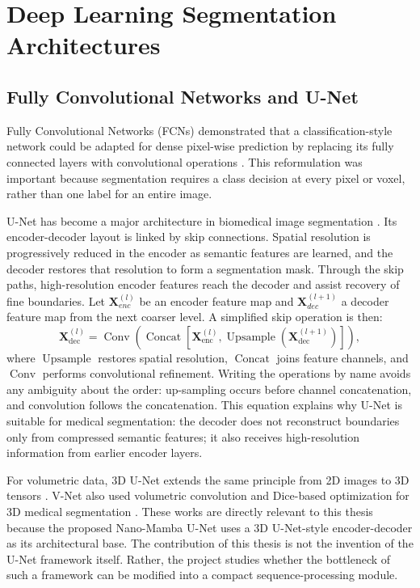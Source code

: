 \section{Deep Learning Segmentation Architectures}
\subsection{Fully Convolutional Networks and U-Net}
Fully Convolutional Networks (FCNs) demonstrated that a classification-style network could be adapted for dense pixel-wise prediction by replacing its fully connected layers with convolutional operations \citep{long2015fully}. This reformulation was important because segmentation requires a class decision at every pixel or voxel, rather than one label for an entire image.

U-Net has become a major architecture in biomedical image segmentation \citep{ronneberger2015u}. Its encoder-decoder layout is linked by skip connections. Spatial resolution is progressively reduced in the encoder as semantic features are learned, and the decoder restores that resolution to form a segmentation mask. Through the skip paths, high-resolution encoder features reach the decoder and assist recovery of fine boundaries. Let $\mathbf{X}^{(l)}_{enc}$ be an encoder feature map and $\mathbf{X}^{(l+1)}_{dec}$ a decoder feature map from the next coarser level. A simplified skip operation is then:
\begin{equation}
    \mathbf{X}^{(l)}_{\mathrm{dec}}
    =\operatorname{Conv}\!\left(
      \operatorname{Concat}\!\left[
        \mathbf{X}^{(l)}_{\mathrm{enc}},
        \operatorname{Upsample}\!\left(\mathbf{X}^{(l+1)}_{\mathrm{dec}}\right)
      \right]
    \right),
\end{equation}
where \(\operatorname{Upsample}\) restores spatial resolution,
\(\operatorname{Concat}\) joins feature channels, and
\(\operatorname{Conv}\) performs convolutional refinement. Writing the
operations by name avoids any ambiguity about the order: up-sampling occurs
before channel concatenation, and convolution follows the concatenation. This
equation explains why U-Net is suitable for medical segmentation: the decoder
does not reconstruct boundaries only from compressed semantic features; it
also receives high-resolution information from earlier encoder layers.

For volumetric data, 3D U-Net extends the same principle from 2D images to 3D tensors \citep{cicek20163d}. V-Net also used volumetric convolution and Dice-based optimization for 3D medical segmentation \citep{milletari2016v}. These works are directly relevant to this thesis because the proposed Nano-Mamba U-Net uses a 3D U-Net-style encoder-decoder as its architectural base. The contribution of this thesis is not the invention of the U-Net framework itself. Rather, the project studies whether the bottleneck of such a framework can be modified into a compact sequence-processing module.

